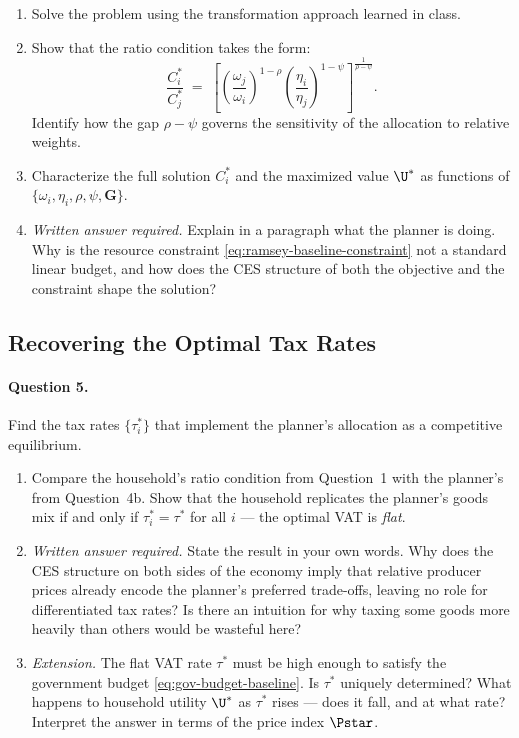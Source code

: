 \begin{enumerate}[label=(\alph*)]
    \item Solve the problem using the transformation approach learned in class.
 
    \item Show that the ratio condition takes the form:
    \[
        \frac{C_i^*}{C_j^*} \;=\; \left[ \left(\frac{\omega_j}{\omega_i}\right)^{1-\rho} \left(\frac{\eta_i}{\eta_j}\right)^{1-\psi} \right]^{\frac{1}{\rho - \psi}}.
    \]
    Identify how the gap $\rho - \psi$ governs the sensitivity of the allocation to relative weights.
 
    \item Characterize the full solution $C_i^*$ and the maximized value $\U^*$ as functions of $\{\omega_i, \eta_i, \rho, \psi, \mathbf{G}\}$.
 
    \item \emph{Written answer required.} Explain in a paragraph what the planner is doing. Why is the resource constraint \eqref{eq:ramsey-baseline-constraint} not a standard linear budget, and how does the CES structure of both the objective and the constraint shape the solution?
\end{enumerate}
 
\subsection{Recovering the Optimal Tax Rates}
\label{subsec:taxes-baseline}
 
\paragraph{Question 5.}
Find the tax rates $\{\tau_i^*\}$ that implement the planner's allocation as a competitive equilibrium.
 
\begin{enumerate}[label=(\alph*)]
    \item Compare the household's ratio condition from Question~1 with the planner's from Question~4b. Show that the household replicates the planner's goods mix if and only if $\tau_i^* = \tau^*$ for all $i$ --- the optimal VAT is \emph{flat}.
 
    \item \emph{Written answer required.} State the result in your own words. Why does the CES structure on both sides of the economy imply that relative producer prices already encode the planner's preferred trade-offs, leaving no role for differentiated tax rates? Is there an intuition for why taxing some goods more heavily than others would be wasteful here?
 
    \item \emph{Extension.} The flat VAT rate $\tau^*$ must be high enough to satisfy the government budget \eqref{eq:gov-budget-baseline}. Is $\tau^*$ uniquely determined? What happens to household utility $\U^*$ as $\tau^*$ rises --- does it fall, and at what rate? Interpret the answer in terms of the price index $\Pstar$.
\end{enumerate}
 
